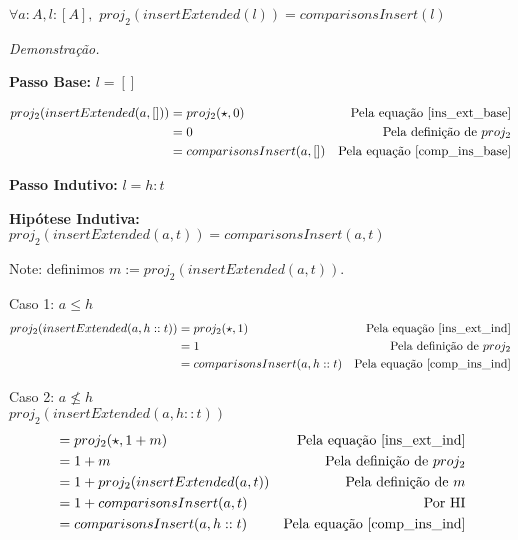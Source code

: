 \documentclass[12pt, oneside, a4paper,english,brazil]{abntex2}
\begin{document}
\begin{teorema}
  $\forall a : A, l : [A], \,\, proj_{2}(insertExtended(l)) = comparisonsInsert(l)$
\end{teorema}

\noindent \textit{Demonstra\c{c}\~ao.}

\textbf{Passo Base: } $l = []$

\begin{align*}
  proj_{2}(insertExtended(a, [])) &= proj_{2}(\star, 0) &\text{Pela equa\c{c}\~ao \ref{ins_ext_base}}\\
                                 &= 0 &\text{Pela defini\c{c}\~ao de } proj_{2} \\
  &= comparisonsInsert(a, []) &\text{Pela equa\c{c}\~ao \ref{comp_ins_base}}
\end{align*}

\textbf{Passo Indutivo: } $l = h : t$

\textbf{Hip\'otese Indutiva: } $proj_{2}(insertExtended(a, t)) = comparisonsInsert(a, t)$

Note: definimos $m := proj_{2}(insertExtended(a, t))$.

Caso 1: $a \le h$
\begin{align*}
  proj_{2}(insertExtended(a, h :: t)) &= proj_{2}(\star, 1) &\text{Pela equa\c{c}\~ao \ref{ins_ext_ind}}\\
                                       &= 1 &\text{Pela defini\c{c}\~ao de } proj_{2} \\
  &= comparisonsInsert(a, h :: t) &\text{Pela equa\c{c}\~ao \ref{comp_ins_ind}}
\end{align*}

Caso 2: $a \not\le h$ \\

$proj_{2}(insertExtended(a, h :: t))$
\begin{align*}
  &= proj_{2}(\star, 1 + m) &\text{Pela equa\c{c}\~ao \ref{ins_ext_ind}} \\
                                    &= 1 + m &\text{Pela defini\c{c}\~ao de } proj_{2} \\
                                    &= 1 + proj_{2}(insertExtended(a, t)) &\text{Pela defini\c{c}\~ao de } m\\
                                    &= 1 + comparisonsInsert(a, t) &\text{Por HI} \\
  &= comparisonsInsert(a, h :: t) &\text{Pela equa\c{c}\~ao \ref{comp_ins_ind}}
\end{align*}
\end{document}
